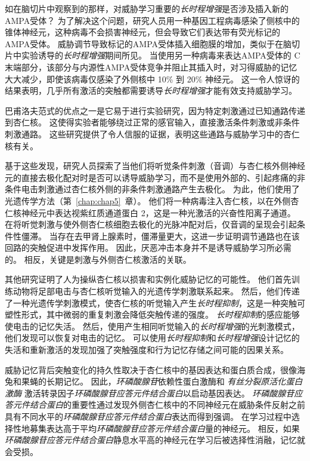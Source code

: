 如在脑切片中观察到的那样，对威胁学习重要的\textit{长时程增强}是否涉及插入新的AMPA受体？
为了解决这个问题，研究人员用一种基因工程病毒感染了侧核中的锥体神经元，这种病毒不会损害神经元，但会导致它们表达带有荧光标记的AMPA受体。
威胁调节导致标记的AMPA受体插入细胞膜的增加，类似于在脑切片中实验诱导的\textit{长时程增强}期间所见。
当使用另一种病毒来表达AMPA受体的 C 末端部分，该部分与内源性AMPA受体竞争并阻止其插入时，对习得威胁的记忆大大减少，即使该病毒仅感染了外侧核中 10\% 到 20\% 神经元。
这一令人惊讶的结果表明，几乎所有激活的突触都需要诱导\textit{长时程增强}才能有效支持威胁学习。


巴甫洛夫范式的优点之一是它易于进行实验研究，因为特定刺激通过已知通路传递到杏仁核。
这使得实验者能够绕过正常的感官输入，直接激活条件刺激或非条件刺激通路。
这些研究提供了令人信服的证据，表明这些通路与威胁学习中的杏仁核有关。


基于这些发现，研究人员探索了当他们将听觉条件刺激（音调）与杏仁核外侧神经元的直接去极化配对时是否可以诱导威胁学习，而不是使用外部的、引起疼痛的非条件电击刺激通过杏仁核外侧的非条件刺激通路产生去极化。
为此，他们使用了光遗传学方法（第~\ref{chap:chap5}~章）。
他们将一种病毒注入杏仁核，以在外侧杏仁核神经元中表达视紫红质通道蛋白 2，这是一种光激活的兴奋性阳离子通道。
在将听觉刺激与使外侧杏仁核细胞去极化的光脉冲配对后，仅音调的呈现会引起条件性僵滞。
当存在去甲肾上腺素时，僵滞量更大，这进一步证明调节通路也在该回路的突触促进中发挥作用。
因此，厌恶冲击本身并不是诱导威胁学习所必需的。
相反，关键是刺激与外侧杏仁核激活的关联。


其他研究证明了人为操纵杏仁核以损害和实例化威胁记忆的可能性。
他们首先训练动物将足部电击与杏仁核听觉输入的光遗传学刺激联系起来。
然后，他们传递了一种光遗传学刺激模式，使杏仁核的听觉输入产生\textit{长时程抑制}，这是一种突触可塑性形式，其中微弱的重复刺激会降低突触传递的强度。
\textit{长时程抑制}的感应能够使电击的记忆失活。
然后，使用产生相同听觉输入的\textit{长时程增强}的光刺激模式，他们发现可以恢复对电击的记忆。
可以使用\textit{长时程抑制}和\textit{长时程增强}设计记忆的失活和重新激活的发现加强了突触强度和行为记忆存储之间可能的因果关系。


威胁记忆背后突触变化的持久性取决于杏仁核中的基因表达和蛋白质合成，很像海兔和果蝇的长期记忆。
因此，\textit{环磷酸腺苷}依赖性蛋白激酶和 \textit{有丝分裂原活化蛋白激酶} 激活转录因子\textit{环磷酸腺苷应答元件结合蛋白}以启动基因表达。
\textit{环磷酸腺苷应答元件结合蛋白}的重要性通过发现外侧杏仁核中的不同神经元在威胁条件反射之前具有不同水平的\textit{环磷酸腺苷应答元件结合蛋白}表达而得到强调。
在学习过程中选择性地募集表达高于平均\textit{环磷酸腺苷应答元件结合蛋白}量的神经元。
相反，如果\textit{环磷酸腺苷应答元件结合蛋白}静息水平高的神经元在学习后被选择性消融，记忆就会受损。


